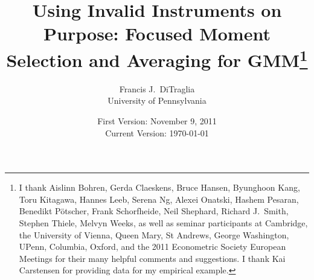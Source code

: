 \documentclass[12pt]{article}
\begin{document}
\title{Using Invalid Instruments on Purpose: Focused Moment Selection and Averaging for GMM\footnote{I thank Aislinn Bohren, Gerda Claeskens, Bruce Hansen, Byunghoon Kang, Toru Kitagawa, Hannes Leeb, Serena Ng, Alexei Onatski, Hashem Pesaran, Benedikt P\"{o}tscher, Frank Schorfheide, Neil Shephard,  Richard J.\ Smith, Stephen Thiele, Melvyn Weeks, as well as seminar participants at Cambridge, the University of Vienna, Queen Mary, St Andrews, George Washington, UPenn, Columbia, Oxford, and the 2011 Econometric Society European Meetings for their many helpful comments and suggestions. I thank Kai Carstensen for providing data for my empirical example.}}

\author{Francis J.\ DiTraglia \\ University of Pennsylvania}

\date{\normalsize First Version: November 9, 2011 \\ Current Version: \today}

\maketitle 
\begin{abstract}
	
\end{abstract}



















\appendix


%
\end{document}
